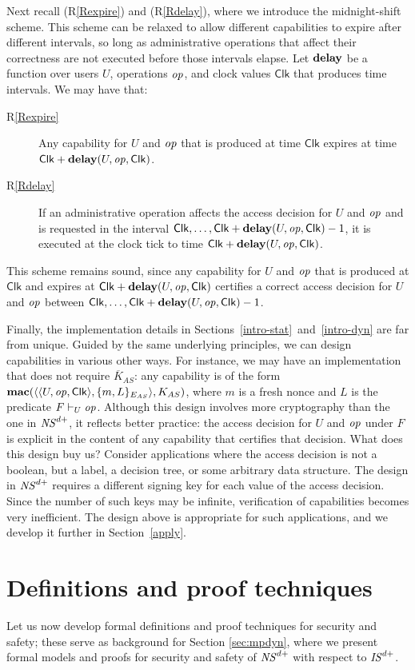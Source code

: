 \documentclass[10pt]{article}
\newcommand{\func}[1]{{\bf #1}}
\newcommand{\clk}{\mathsf{Clk}}
\newcommand{\op}{{\it op}}
\newcommand{\tup}[1]{\langle #1\rangle}
\begin{document}
Next recall (R\ref{Rexpire}) and (R\ref{Rdelay}), where we introduce the midnight-shift scheme. This scheme can be relaxed to allow different capabilities to expire after different intervals, so long as administrative operations that affect their correctness are not executed before those intervals elapse. Let $\func{delay}$ be a function over users $U$, operations $\op$, and clock values $\clk$ that produces time intervals. We may have that:
\begin{description}
\item[R\ref{Rexpire}] Any capability for $U$ and $\op$ that is produced at time $\clk$ expires at time $\clk+\func{delay}(U,\op,\clk)$.
\item[R\ref{Rdelay}] If an administrative operation affects the access decision for $U$ and $\op$ and is requested in the interval $\clk,\dots,\clk+\func{delay}(U,\op,\clk) - 1$, it is executed at the clock tick to time $\clk + \func{delay}(U,\op,\clk)$.  
\end{description}
This scheme remains sound, since any capability for $U$ and $\op$ that is produced at $\clk$ and expires at $\clk + \func{delay}(U,\op,\clk)$ certifies a correct access decision for $U$ and $\op$ between $\clk,\dots,\clk+\func{delay}(U,\op,\clk) - 1$.

Finally, the implementation details in Sections~\ref{intro-stat}~and~\ref{intro-dyn} are far from unique. Guided by the same underlying principles, we can design capabilities in various other ways. For instance, we may have an implementation that does not require $\overline K_{AS}$: any capability is of the form $\func{mac}(\tup{\tup{U,\op,\clk},\{m,L\}_{E_{AS}}},K_{AS})$, where $m$ is a fresh nonce and $L$ is the predicate $F \vdash_U \op$.
Although this design involves more cryptography than the one in ${\it NS}^{d+}$, it reflects better practice: the access decision for $U$ and $\op$ under $F$ is explicit in the content of any capability that certifies that decision. What does this design buy us? Consider applications where the access decision is not a boolean, but a label, a decision tree, or some arbitrary data structure. 
The design in ${\it NS}^{d+}$ requires a different signing key for each value of the access decision. Since the number of such keys may be infinite, verification of capabilities becomes very inefficient. The design above is appropriate for such applications, and we develop it further in Section~\ref{apply}. 



\section{Definitions and proof techniques}\label{theory}
\noindent
Let us now develop formal definitions and proof techniques for security and safety; these serve as background for Section \ref{sec:mpdyn}, where we present formal models and proofs for security and safety of ${\it NS}^{d+}$ with respect to ${\it IS}^{d+}$. 
\end{document}

